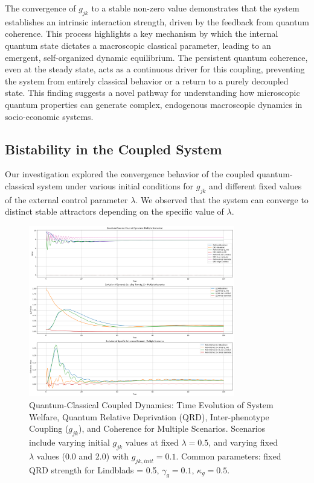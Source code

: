 \documentclass[9pt]{article}
\begin{document}
The convergence of $g_{jk}$ to a stable non-zero value demonstrates that the system establishes an intrinsic interaction strength, driven by the feedback from quantum coherence. This process highlights a key mechanism by which the internal quantum state dictates a macroscopic classical parameter, leading to an emergent, self-organized dynamic equilibrium. The persistent quantum coherence, even at the steady state, acts as a continuous driver for this coupling, preventing the system from entirely classical behavior or a return to a purely decoupled state. This finding suggests a novel pathway for understanding how microscopic quantum properties can generate complex, endogenous macroscopic dynamics in socio-economic systems.

\subsection{Bistability in the Coupled System}
Our investigation explored the convergence behavior of the coupled quantum-classical system under various initial conditions for $g_{jk}$ and different fixed values of the external control parameter $\lambda$. We observed that the system can converge to distinct stable attractors depending on the specific value of $\lambda$.

\begin{figure}[h!]
    \centering
    \includegraphics[width=0.8\textwidth]{phenotourfig3.png} %
    \caption{Quantum-Classical Coupled Dynamics: Time Evolution of System Welfare, Quantum Relative Deprivation (QRD), Inter-phenotype Coupling ($g_{jk}$), and Coherence for Multiple Scenarios. Scenarios include varying initial $g_{jk}$ values at fixed $\lambda=0.5$, and varying fixed $\lambda$ values (0.0 and 2.0) with $g_{jk,init}=0.1$. Common parameters: fixed QRD strength for Lindblads = 0.5, $\gamma_g = 0.1$, $\kappa_g = 0.5$.}
    \label{fig:multiple_scenarios_gjk}
\end{figure}
\end{document}
